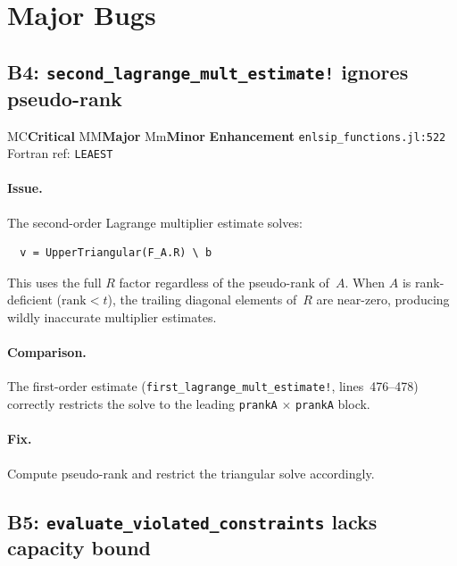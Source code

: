 \documentclass[11pt, a4paper]{article}
\newcommand{\fortranref}[1]{\texttt{#1}}
\newcommand{\juliaref}[2]{\texttt{#1:#2}}
\newcommand{\severity}[1]{%
  \ifx#1C\colorbox{red!20}{\textbf{Critical}}%
  \else\ifx#1M\colorbox{orange!20}{\textbf{Major}}%
  \else\ifx#1m\colorbox{yellow!20}{\textbf{Minor}}%
  \else\colorbox{blue!10}{\textbf{Enhancement}}%
  \fi\fi\fi%
}
\begin{document}
\section{Major Bugs}
\label{sec:major}

\subsection{B4: \texttt{second\_lagrange\_mult\_estimate!} ignores pseudo-rank}
\label{sec:b4}

\severity{M} \quad \juliaref{enlsip\_functions.jl}{522}
\quad Fortran ref: \fortranref{LEAEST}

\paragraph{Issue.}
The second-order Lagrange multiplier estimate solves:
\begin{lstlisting}
  v = UpperTriangular(F_A.R) \ b
\end{lstlisting}
This uses the full $R$ factor regardless of the pseudo-rank of~$A$.
When $A$ is rank-deficient ($\mathrm{rank} < t$), the trailing diagonal
elements of~$R$ are near-zero, producing wildly inaccurate multiplier
estimates.

\paragraph{Comparison.}
The first-order estimate (\texttt{first\_lagrange\_mult\_estimate!},
lines~476--478) correctly restricts the solve to the leading
\texttt{prankA} $\times$ \texttt{prankA} block.

\paragraph{Fix.}
Compute pseudo-rank and restrict the triangular solve accordingly.

\subsection{B5: \texttt{evaluate\_violated\_constraints} lacks capacity bound}
\label{sec:b5}
\end{document}

